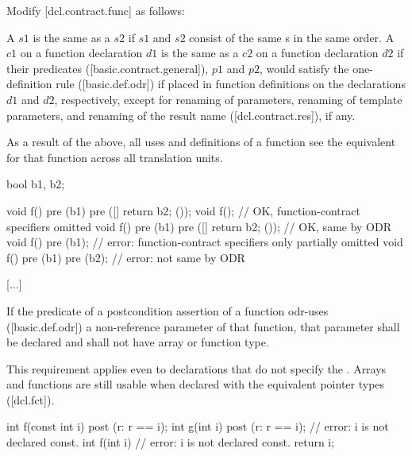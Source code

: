 Modify [dcl.contract.func] as follows:

\begin{adjustwidth}{0.5cm}{0.5cm}
A  $s1$ is the same as a  $s2$ if $s1$ and $s2$ consist of the same s in the same order. A  $c1$ on a function declaration $d1$ is the same as a 
$c2$ on a function declaration $d2$ if their predicates ([basic.contract.general]), $p1$ and $p2$,
would satisfy the one-definition rule ([basic.def.odr]) if placed in function definitions on
the declarations $d1$ and $d2$, respectively, except for renaming of parameters, renaming of
template parameters, and renaming of the result name ([dcl.contract.res]), if any.
\begin{note}
As a result of the above, all uses and definitions of a function see the equivalent
 for that function across all translation units.
\end{note}
\begin{addedblock}
\begin{example}
\begin{codeblock}
bool b1, b2;

void f() pre (b1) pre ([]{ return b2; }());
void f();                    // OK, function-contract specifiers omitted
void f() pre (b1) pre ([]{ return b2; }());  // OK, same by ODR
void f() pre (b1);           // error: function-contract specifiers only partially omitted
void f() pre (b1) pre (b2);  // error: not same by ODR
\end{codeblock}
\end{example}
\end{addedblock}

[...]

If the predicate of a postcondition assertion of a function odr-uses ([basic.def.odr]) a
non-reference parameter of that function, that parameter shall be declared  and
shall not have array or function type.
\begin{note}
This requirement applies even to declarations that do not specify the . Arrays and functions are still usable when
declared with the equivalent pointer types ([dcl.fct]). 
\end{note}
\begin{example}
\begin{codeblock}
int f(const int i)
post (r: r == i);
int g(int i)
post (r: r == i); // error: i is not declared const.
int f(int i) // error: i is not declared const.
{
  return i;
}


\end{codeblock}
\end{example}
\end{adjustwidth}

